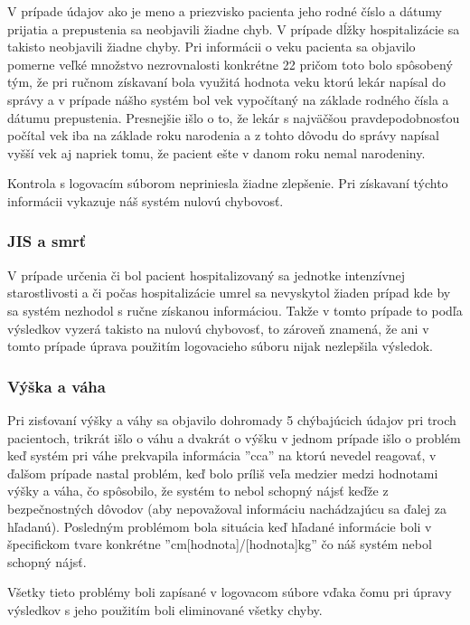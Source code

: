 V prípade údajov ako je meno a priezvisko pacienta jeho rodné číslo a dátumy prijatia a prepustenia sa neobjavili žiadne chyb. V prípade dĺžky hospitalizácie sa takisto neobjavili žiadne chyby. Pri informácii o veku pacienta sa objavilo pomerne veľké množstvo nezrovnalosti konkrétne 22 pričom toto bolo spôsobený tým, že pri ručnom získavaní bola využitá hodnota veku ktorú lekár napísal do správy a v prípade nášho systém bol vek vypočítaný na základe rodného čísla a dátumu prepustenia. Presnejšie išlo o to, že lekár s najväčšou pravdepodobnosťou počítal vek iba na základe roku narodenia a z tohto dôvodu do správy napísal vyšší vek aj napriek tomu, že pacient ešte v danom roku nemal narodeniny.

Kontrola s logovacím súborom nepriniesla žiadne zlepšenie. Pri získavaní týchto informácii vykazuje náš systém nulovú chybovosť.

\subsubsection{JIS a smrť}

V prípade určenia či bol pacient hospitalizovaný sa jednotke intenzívnej starostlivosti a či počas hospitalizácie umrel sa nevyskytol žiaden prípad kde by sa systém nezhodol s ručne získanou informáciou. Takže v tomto prípade to podľa výsledkov vyzerá takisto na nulovú chybovosť, to zároveň znamená, že ani v tomto prípade úprava použitím logovacieho súboru nijak nezlepšila výsledok. 

\subsubsection{Výška a váha}

Pri zisťovaní výšky a váhy sa objavilo dohromady 5 chýbajúcich údajov pri troch pacientoch, trikrát išlo o váhu a dvakrát o výšku v jednom prípade išlo o problém keď systém pri váhe prekvapila informácia ''cca'' na ktorú nevedel reagovať, v ďalšom prípade nastal problém, keď bolo príliš veľa medzier medzi hodnotami výšky a váha, čo spôsobilo, že systém to nebol schopný nájsť keďže z bezpečnostných dôvodov (aby nepovažoval informáciu nachádzajúcu sa ďalej za hľadanú). Posledným problémom bola situácia keď hľadané informácie boli v špecifickom tvare konkrétne ''cm[hodnota]/[hodnota]kg'' čo náš systém nebol schopný nájsť.

Všetky tieto problémy boli zapísané v logovacom súbore vďaka čomu pri úpravy výsledkov s jeho použitím boli eliminované všetky chyby.

